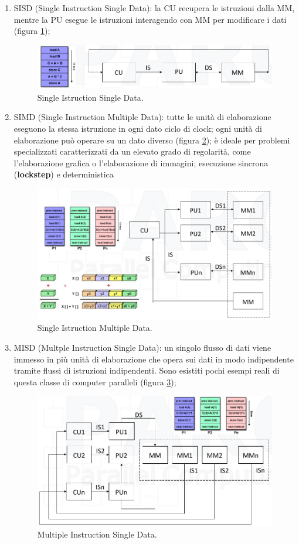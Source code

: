 \begin{enumerate}
	\item SISD (Single Instruction Single Data): la CU recupera le istruzioni dalla MM, mentre la PU esegue le istruzioni interagendo con MM per modificare i dati (figura \ref{fig:sisd});
	\begin{figure}[th]
		\centering
		\includegraphics[width=0.7\linewidth]{img/sisd}
		\caption{Single Istruction Single Data.}
		\label{fig:sisd}
	\end{figure}
	\item SIMD (Single Instruction Multiple Data): tutte le unità di elaborazione eseguono la stessa istruzione in ogni dato ciclo di clock; ogni unità di elaborazione può operare su un dato diverso (figura \ref{fig:simd}); è ideale per problemi specializzati caratterizzati da un elevato grado di regolarità, come l'elaborazione grafica o l'elaborazione di immagini; esecuzione sincrona (\textbf{lockstep}) e deterministica
	\begin{figure}[th]
		\centering
		\includegraphics[width=0.7\linewidth]{img/simd}
		\caption{Single Istruction Multiple Data.}
		\label{fig:simd}
	\end{figure}

	\item MISD (Multple Instruction Single Data): un singolo flusso di dati viene immesso in più unità di elaborazione che opera sui dati in modo indipendente tramite flussi di istruzioni indipendenti. Sono esistiti pochi esempi reali di questa classe di computer paralleli (figura \ref{fig:misd});
	\begin{figure}[th]
		\centering
		\includegraphics[width=0.7\linewidth]{img/misd}
		\caption{Multiple Instruction Single Data.}
		\label{fig:misd}
	\end{figure}


\end{enumerate}
